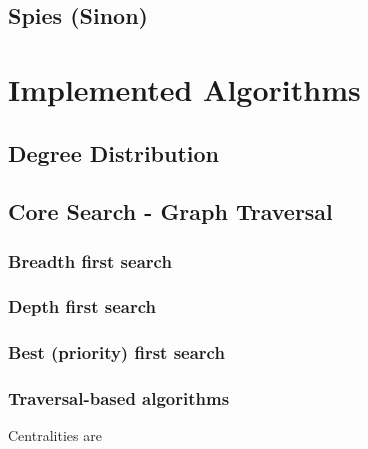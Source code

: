 	\subsection{Spies (Sinon)}
	\label{ssect:spies}


\section{Implemented Algorithms}
\label{sect:implemented_algos}

	\subsection{Degree Distribution}
	\label{ssect:deg_dist}

	\subsection{Core Search - Graph Traversal}
	\label{ssect:core_search}
	
		\subsubsection{Breadth first search}
		\label{sssect:search_bfs}
		
		\subsubsection{Depth first search}
		\label{sssect:search_dfs}
		
		\subsubsection{Best (priority) first search}
		\label{sssect:search_pfs}
		
		\subsubsection{Traversal-based algorithms}
		\label{sssect:travseral_algos}
		
		Centralities are 
	

